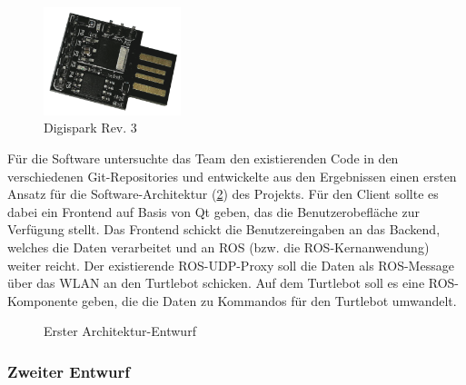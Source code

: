 \documentclass[a4paper,12pt,headsepline]{scrartcl}
\begin{document}
		\begin{figure}[H]
			\centering
			\includegraphics[width=4cm]{Images/digispark.png}
			\caption{Digispark Rev. 3}
			\label{fig:digispark}
		\end{figure}

		Für die Software untersuchte das Team den existierenden Code in den verschiedenen Git-Repositories und entwickelte aus den Ergebnissen einen ersten Ansatz für die Software-Architektur (\cref{fig:arch01}) des Projekts. Für den Client sollte es dabei ein Frontend auf Basis von Qt geben, das die Benutzerobefläche zur Verfügung stellt. Das Frontend schickt die Benutzereingaben an das Backend, welches die Daten verarbeitet und an ROS (bzw. die ROS-Kernanwendung) weiter reicht. Der existierende ROS-UDP-Proxy soll die Daten als ROS-Message über das WLAN an den Turtlebot schicken. Auf dem Turtlebot soll es eine ROS-Komponente geben, die die Daten zu Kommandos für den Turtlebot umwandelt. 
		\begin{figure}[H]
			\centering
			\resizebox{\textwidth}{!}{}
			\caption{Erster Architektur-Entwurf}
			\label{fig:arch01}
		\end{figure}

	\subsubsection{Zweiter Entwurf} \label{sec:entwurf2}
\end{document}
